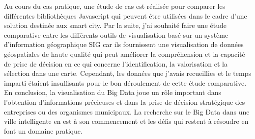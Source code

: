 \documentclass[french, a4paper, 12pt]{report}
\begin{document}
Au cours du cas pratique, une étude de cas est réalisée pour comparer les différentes bibliothèques Javascript qui peuvent être utilisées dans le cadre d’une solution destinée aux smart city. 
Par la suite, j’ai souhaité faire une étude comparative entre les différents outils de visualisation basé sur un système d’information géographique SIG car ils fournissent une visualisation de données géospatiales de haute qualité qui peut améliorer la compréhension et la capacité de prise de décision en ce qui concerne l’identification, la valorisation et la sélection dans une carte. Cependant, les données que j’avais recueillies et le temps imparti étaient insuffisants pour le bon déroulement de cette étude comparative.\\

En conclusion, la visualisation du Big Data joue un rôle important dans l'obtention d'informations précieuses et dans la prise de décision stratégique des entreprises ou des organismes municipaux.  La recherche sur le Big Data dans une ville intelligente en est à son commencement et les défis qui restent à résoudre en font un domaine pratique.
\end{document}
